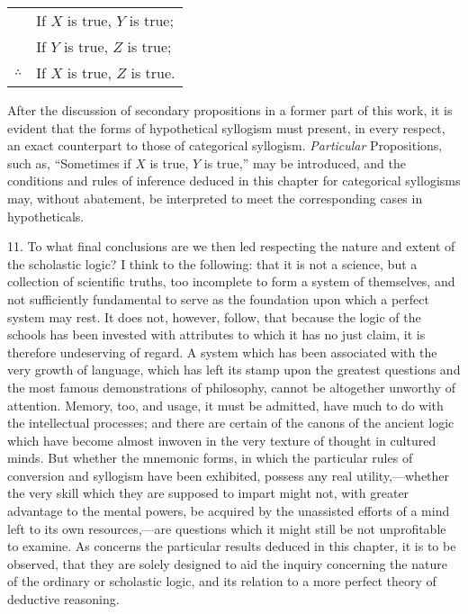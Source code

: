 \documentclass[oneside]{book}
\begin{document}
\begin{tabular}{rl}
            & If $X$ is true, $Y$ is true;   \\
            & If $Y$ is true, $Z$ is true;   \\
$\therefore$ & If $X$ is true, $Z$ is true.
\end{tabular}

After the discussion of secondary propositions in a former
part of this work, it is evident that the forms of hypothetical
syllogism must present, in every respect, an exact counterpart to
those of categorical syllogism. \emph{Particular} Propositions, such as,
``Sometimes if $X$ is true, $Y$ is true,'' may be introduced, and the
conditions and rules of inference deduced in this chapter for categorical
syllogisms may, without abatement, be interpreted to
meet the corresponding cases in hypotheticals.

11. To what final conclusions are we then led respecting the
nature and extent of the scholastic logic? I think to the following:
that it is not a science, but a collection of scientific truths, too
incomplete to form a system of themselves, and not sufficiently
fundamental to serve as the foundation upon which a perfect
system may rest. It does not, however, follow, that because the
logic of the schools has been invested with attributes to which it
has no just claim, it is therefore undeserving of regard. A system
which has been associated with the very growth of language,
which has left its stamp upon the greatest questions and the
most famous demonstrations of philosophy, cannot be altogether
unworthy of attention. Memory, too, and usage, it must be admitted,
have much to do with the intellectual processes; and
there are certain of the canons of the ancient logic which have
become almost inwoven in the very texture of thought in cultured
minds. But whether the mnemonic forms, in which the particular
rules of conversion and syllogism have been exhibited, possess
any real utility,---whether the very skill which they are supposed
to impart might not, with greater advantage to the mental
powers, be acquired by the unassisted efforts of a mind left to its
own resources,---are questions which it might still be not unprofitable
to examine. As concerns the particular results deduced
in this chapter, it is to be observed, that they are solely
designed to aid the inquiry concerning the nature of the ordinary
or scholastic logic, and its relation to a more perfect theory of
deductive reasoning.
\end{document}
